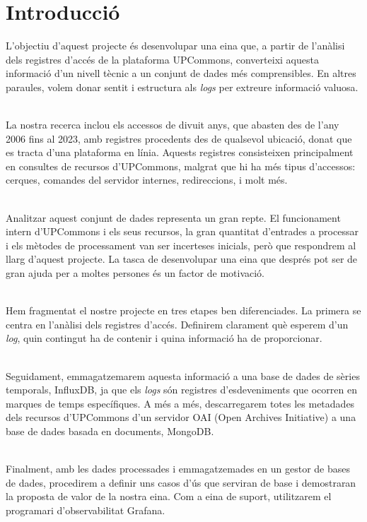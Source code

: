\chapter*{Introducció}\label{ch:introduction}

L’objectiu d’aquest projecte és desenvolupar una eina que, a partir de l’anàlisi dels registres d’accés de la plataforma UPCommons, converteixi aquesta informació d’un nivell tècnic a un conjunt de dades més comprensibles.
En altres paraules, volem donar sentit i estructura als \textit{\gls{log}s} per extreure informació valuosa.

\noindent \\
La nostra recerca inclou els accessos de divuit anys, que abasten des de l’any 2006 fins al 2023, amb registres procedents des de qualsevol ubicació, donat que es tracta d’una plataforma en línia.
Aquests registres consisteixen principalment en consultes de recursos d’UPCommons, malgrat que hi ha més tipus d’accessos: cerques, comandes del servidor internes, redireccions, i molt més.

\noindent \\
Analitzar aquest conjunt de dades representa un gran repte.
El funcionament intern d’UPCommons i els seus recursos, la gran quantitat d’entrades a processar i els mètodes de processament van ser incerteses inicials, però que respondrem al llarg d’aquest projecte.
La tasca de desenvolupar una eina que després pot ser de gran ajuda per a moltes persones és un factor de motivació.

\noindent \\
Hem fragmentat el nostre projecte en tres etapes ben diferenciades.
La primera se centra en l’anàlisi dels registres d’accés.
Definirem clarament què esperem d’un \textit{\gls{log}}, quin contingut ha de contenir i quina informació ha de proporcionar.

\noindent \\
Seguidament, emmagatzemarem aquesta informació a una base de dades de sèries temporals, InfluxDB, ja que els \textit{\gls{log}s} són registres d’esdeveniments que ocorren en marques de temps específiques.
A més a més, descarregarem totes les metadades dels recursos d’UPCommons d’un servidor OAI (Open Archives Initiative) a una base de dades basada en documents, MongoDB.

\noindent \\
Finalment, amb les dades processades i emmagatzemades en un gestor de bases de dades, procedirem a definir uns casos d’ús que serviran de base i demostraran la proposta de valor de la nostra eina.
Com a eina de suport, utilitzarem el programari d’observabilitat Grafana.

